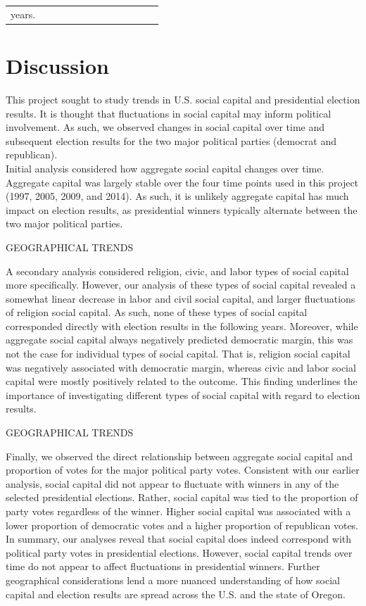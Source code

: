 \documentclass[
  english,
  man]{apa6}
\begin{document}
\begin{table}
\begin{tabular}[t]{c|c|c|c|c|c|c|c|c|c|c|c|c}
years.}\\
\end{tabular}
\end{table}

\hypertarget{discussion}{%
\section{Discussion}\label{discussion}}

This project sought to study trends in U.S. social capital and presidential election results. It is thought that fluctuations in social capital may inform political involvement. As such, we observed changes in social capital over time and subsequent election results for the two major political parties (democrat and republican).\\
Initial analysis considered how aggregate social capital changes over time. Aggregate capital was largely stable over the four time points used in this project (1997, 2005, 2009, and 2014). As such, it is unlikely aggregate capital has much impact on election results, as presidential winners typically alternate between the two major political parties.

GEOGRAPHICAL TRENDS

A secondary analysis considered religion, civic, and labor types of social capital more specifically. However, our analysis of these types of social capital revealed a somewhat linear decrease in labor and civil social capital, and larger fluctuations of religion social capital. As such, none of these types of social capital corresponded directly with election results in the following years. Moreover, while aggregate social capital always negatively predicted democratic margin, this was not the case for individual types of social capital. That is, religion social capital was negatively associated with democratic margin, whereas civic and labor social capital were mostly positively related to the outcome. This finding underlines the importance of investigating different types of social capital with regard to election results.

GEOGRAPHICAL TRENDS

Finally, we observed the direct relationship between aggregate social capital and proportion of votes for the major political party votes. Consistent with our earlier analysis, social capital did not appear to fluctuate with winners in any of the selected presidential elections. Rather, social capital was tied to the proportion of party votes regardless of the winner. Higher social capital was associated with a lower proportion of democratic votes and a higher proportion of republican votes.\\
In summary, our analyses reveal that social capital does indeed correspond with political party votes in presidential elections. However, social capital trends over time do not appear to affect fluctuations in presidential winners. Further geographical considerations lend a more nuanced understanding of how social capital and election results are spread across the U.S. and the state of Oregon.
\end{document}

